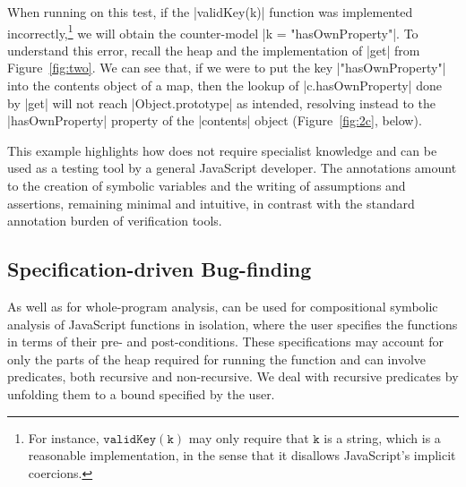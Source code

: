 % 
When running \cosette on this test, if the \jsinline|validKey(k)| function was implemented incorrectly,\footnote{For instance, $\mathtt{validKey(k)}$ may only require that $\mathtt{k}$ is a string, which is a reasonable implementation, in the sense that it disallows JavaScript's implicit coercions.}
we will obtain the counter-model \jsinline|k = "hasOwnProperty"|. To understand this error, recall the heap and the implementation of \jsinline|get| from Figure~\ref{fig:two}. We can see that, if we were to put the key \jsinline|"hasOwnProperty"| into the contents object of a map, then the lookup of \jsinline|c.hasOwnProperty| done by \jsinline|get| will not reach \jsinline|Object.prototype| as intended, resolving instead to the \jsinline|hasOwnProperty| property of the \jsinline|contents| object (Figure~\ref{fig:2c}, below).

This example highlights how \cosette does not require specialist knowledge and can 
be used as a testing tool by a general JavaScript developer. The annotations amount to the creation of 
symbolic variables and the writing of assumptions and assertions, remaining minimal and intuitive, in contrast with the standard annotation burden of verification tools.

\vspace*{-0.2cm}
\subsection{Specification-driven Bug-finding}
\label{subsec:sdbf}


As well as for whole-program analysis, \cosette can be used for compositional symbolic analysis of JavaScript functions in isolation, where the user specifies the functions in terms of their pre- and post-conditions. These specifications may account for only the parts of the heap required for running the function and can involve predicates, both recursive and non-recursive. We deal with recursive predicates by unfolding them to a  bound specified by the user.

